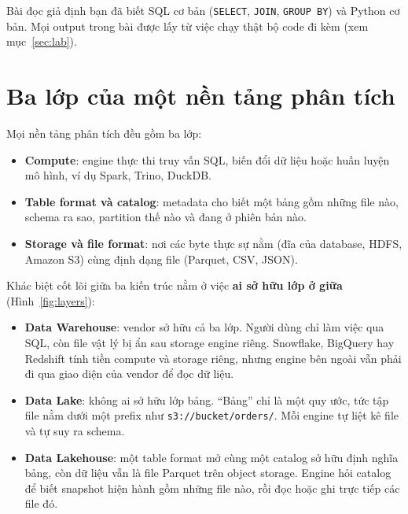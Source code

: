 \documentclass[12pt]{article}
\begin{document}
\begin{notebox}
Bài đọc giả định bạn đã biết SQL cơ bản (\texttt{SELECT}, \texttt{JOIN}, \texttt{GROUP BY}) và Python cơ bản. Mọi output trong bài được lấy từ việc chạy thật bộ code đi kèm (xem mục~\ref{sec:lab}).
\end{notebox}

\section{Ba lớp của một nền tảng phân tích}
\label{sec:layers}

Mọi nền tảng phân tích đều gồm ba lớp:

\begin{itemize}
    \item \textbf{Compute}: engine thực thi truy vấn SQL, biến đổi dữ liệu hoặc huấn luyện mô hình, ví dụ Spark, Trino, DuckDB.
    \item \textbf{Table format và catalog}: metadata cho biết một bảng gồm những file nào, schema ra sao, partition thế nào và đang ở phiên bản nào.
    \item \textbf{Storage và file format}: nơi các byte thực sự nằm (đĩa của database, HDFS, Amazon S3) cùng định dạng file (Parquet, CSV, JSON).
\end{itemize}

Khác biệt cốt lõi giữa ba kiến trúc nằm ở việc \textbf{ai sở hữu lớp ở giữa} (Hình~\ref{fig:layers}):

\begin{itemize}
    \item \textbf{Data Warehouse}: vendor sở hữu cả ba lớp. Người dùng chỉ làm việc qua SQL, còn file vật lý bị ẩn sau storage engine riêng. Snowflake, BigQuery hay Redshift tính tiền compute và storage riêng, nhưng engine bên ngoài vẫn phải đi qua giao diện của vendor để đọc dữ liệu.
    \item \textbf{Data Lake}: không ai sở hữu lớp bảng. ``Bảng'' chỉ là một quy ước, tức tập file nằm dưới một prefix như \texttt{s3://bucket/orders/}. Mỗi engine tự liệt kê file và tự suy ra schema.
    \item \textbf{Data Lakehouse}: một table format mở cùng một catalog sở hữu định nghĩa bảng, còn dữ liệu vẫn là file Parquet trên object storage. Engine hỏi catalog để biết snapshot hiện hành gồm những file nào, rồi đọc hoặc ghi trực tiếp các file đó.
\end{itemize}
\end{document}
